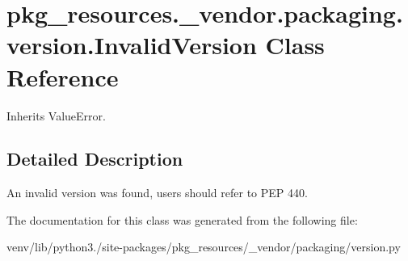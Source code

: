 \hypertarget{classpkg__resources_1_1__vendor_1_1packaging_1_1version_1_1_invalid_version}{}\section{pkg\+\_\+resources.\+\_\+vendor.\+packaging.\+version.\+Invalid\+Version Class Reference}
\label{classpkg__resources_1_1__vendor_1_1packaging_1_1version_1_1_invalid_version}


Inherits Value\+Error.



\subsection{Detailed Description}
\begin{DoxyVerb}An invalid version was found, users should refer to PEP 440.
\end{DoxyVerb}
 

The documentation for this class was generated from the following file\+:\begin{DoxyCompactItemize}
\item 
venv/lib/python3./site-\/packages/pkg\+\_\+resources/\+\_\+vendor/packaging/version.\+py\end{DoxyCompactItemize}
